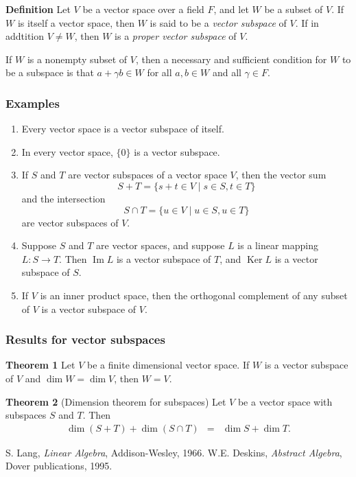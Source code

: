 \documentclass{article}
\begin{document}
{\bf Definition} 
Let $V$ be a vector space over a field $F$, 
and let $W$ be a subset of $V$.
If $W$ is itself a vector space,
then $W$ is said to be a \emph{vector subspace} of $V$.
If in addtition $V\neq W$, then $W$ is a \emph{proper vector subspace} of $V$. 

If $W$ is a nonempty subset of $V$,
then a necessary and sufficient condition for $W$ to be a subspace
is that $a+\gamma b \in W$ 
for all $a,b \in W$ and all $\gamma \in F$.

\subsubsection{Examples}
\begin{enumerate}
\item Every vector space is a vector subspace of itself.
\item In every vector space, $\{0\}$ is a vector subspace.
\item If $S$ and $T$ are vector subspaces of a vector space $V$, 
then the vector sum 
\[
  S+T=\{s+t \in V \mid s\in S, t\in T\}
\]
and the intersection 
\[
  S\cap T = \{u \in V \mid u\in S, u\in T \}
\]
are vector subspaces of $V$.
\item Suppose $S$ and $T$ are vector spaces,
and suppose $L$ is a linear
mapping $L\colon S\to T$.
Then $\operatorname{Im}L$ is a vector subspace of $T$,
and $\operatorname{Ker}L$ is a vector subspace of $S$.
\item If $V$ is an inner product space,
then the orthogonal complement of any subset of $V$
is a vector subspace of $V$.
\end{enumerate}

\subsubsection{Results for vector subspaces}

{\bf Theorem 1} \cite{lang}
 Let $V$ be a finite dimensional vector space.
 If $W$ is a vector subspace of $V$ and $\dim W=\dim V$, then $W=V$.
 
 {\bf Theorem 2} \cite{deskins} (Dimension theorem for subspaces)
 Let $V$ be a vector space with
 subspaces $S$ and $T$. Then
 \begin{eqnarray*}
 \dim (S+T) + \dim (S\cap T) &=& \dim S + \dim T.
 \end{eqnarray*}
 
 \begin{thebibliography}{9}
  S. Lang,
 \emph{Linear Algebra},
 Addison-Wesley, 1966.
  W.E. Deskins,
 \emph{Abstract Algebra},
 Dover publications,
 1995.
 \end{thebibliography}
\end{document}

